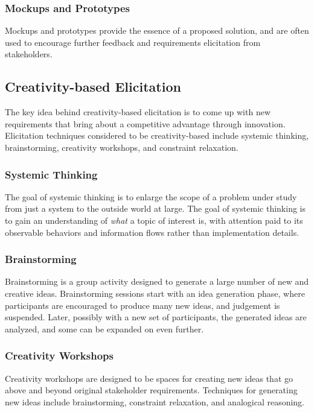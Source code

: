 \documentclass[12pt,titlepage]{article}
\begin{document}
      \subsubsection{Mockups and Prototypes}
        Mockups and prototypes provide the essence of a proposed solution, and are often used to encourage further feedback and requirements elicitation from stakeholders.

    \subsection{Creativity-based Elicitation}
      The key idea behind creativity-based elicitation is to come up with new requirements that bring about a competitive advantage through innovation. Elicitation techniques
      considered to be creativity-based include systemic thinking, brainstorming, creativity workshops, and constraint relaxation.

      \subsubsection{Systemic Thinking}
        The goal of systemic thinking is to enlarge the scope of a problem under study from just a system to the outside world at large. The goal of systemic thinking is to
        gain an understanding of \textit{what} a topic of interest is, with attention paid to its observable behaviors and information flows rather than implementation
        details.

      \subsubsection{Brainstorming}
        Brainstorming is a group activity designed to generate a large number of new and creative ideas. Brainstorming sessions start with an idea generation phase, where
        participants are encouraged to produce many new ideas, and judgement is suspended. Later, possibly with a new set of participants, the generated ideas are analyzed,
        and some can be expanded on even further.

      \subsubsection{Creativity Workshops}
        Creativity workshops are designed to be spaces for creating new ideas that go above and beyond original stakeholder requirements. Techniques for generating new ideas
        include brainstorming, constraint relaxation, and analogical reasoning.
\end{document}
